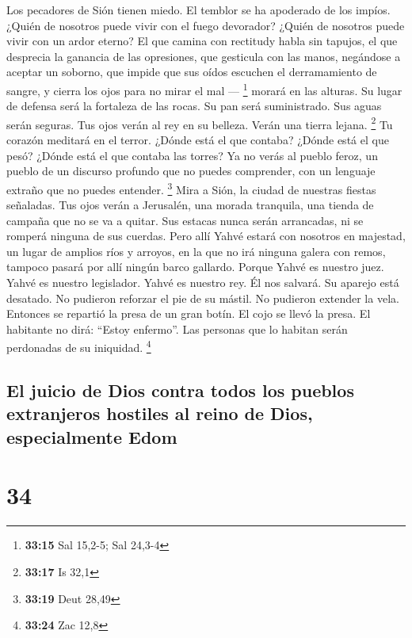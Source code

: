  Los pecadores de Sión tienen miedo. El temblor se ha
apoderado de los impíos. ¿Quién de nosotros puede vivir con el fuego
devorador? ¿Quién de nosotros puede vivir con un ardor eterno?
 El que camina con rectitudy habla sin tapujos, el que
desprecia la ganancia de las opresiones, que gesticula con las manos,
negándose a aceptar un soborno, que impide que sus oídos escuchen el
derramamiento de sangre, y cierra los ojos para no mirar el mal ---
\footnote{\textbf{33:15} Sal 15,2-5; Sal 24,3-4}  morará
en las alturas. Su lugar de defensa será la fortaleza de las rocas. Su
pan será suministrado. Sus aguas serán seguras.  Tus ojos
verán al rey en su belleza. Verán una tierra lejana. \footnote{\textbf{33:17}
  Is 32,1}  Tu corazón meditará en el terror. ¿Dónde está
el que contaba? ¿Dónde está el que pesó? ¿Dónde está el que contaba las
torres?  Ya no verás al pueblo feroz, un pueblo de un
discurso profundo que no puedes comprender, con un lenguaje extraño que
no puedes entender. \footnote{\textbf{33:19} Deut 28,49} 
Mira a Sión, la ciudad de nuestras fiestas señaladas. Tus ojos verán a
Jerusalén, una morada tranquila, una tienda de campaña que no se va a
quitar. Sus estacas nunca serán arrancadas, ni se romperá ninguna de sus
cuerdas.  Pero allí Yahvé estará con nosotros en
majestad, un lugar de amplios ríos y arroyos, en la que no irá ninguna
galera con remos, tampoco pasará por allí ningún barco gallardo.
 Porque Yahvé es nuestro juez. Yahvé es nuestro
legislador. Yahvé es nuestro rey. Él nos salvará.  Su
aparejo está desatado. No pudieron reforzar el pie de su mástil. No
pudieron extender la vela. Entonces se repartió la presa de un gran
botín. El cojo se llevó la presa.  El habitante no dirá:
``Estoy enfermo''. Las personas que lo habitan serán perdonadas de su
iniquidad. \footnote{\textbf{33:24} Zac 12,8}

\hypertarget{el-juicio-de-dios-contra-todos-los-pueblos-extranjeros-hostiles-al-reino-de-dios-especialmente-edom}{%
\subsection{El juicio de Dios contra todos los pueblos extranjeros
hostiles al reino de Dios, especialmente
Edom}\label{el-juicio-de-dios-contra-todos-los-pueblos-extranjeros-hostiles-al-reino-de-dios-especialmente-edom}}

\hypertarget{section-33}{%
\section{34}\label{section-33}}

